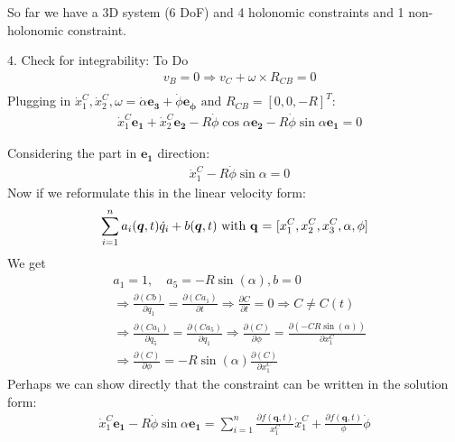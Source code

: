 \noindent So far we have a 3D system (6 DoF) and 4 holonomic constraints and 1 non-holonomic constraint.\vspace{1cm}

4. Check for integrability:
\Huge \color{red}To Do \color{black}\normalsize
\begin{equation}
    \begin{split}
        &v_B = 0 \Rightarrow v_C + \omega \times R_{CB} = 0\\
    \end{split}
\end{equation}
Plugging in $\dot{x}_1^C, \dot{x}_2^C, \omega = \dot{\alpha}\boldsymbol{e_3} + \dot\phi\boldsymbol{e_\phi} \text{ and } R_{CB} = [0,0,-R]^T$:
\begin{equation}
    \begin{split}
        &\dot x_1^C\boldsymbol{e_1} + \dot x_2^C\boldsymbol{e_2} -  R\dot\phi\cos\alpha\boldsymbol{e_2} - R\dot\phi\sin\alpha\boldsymbol{e_1} = 0
    \end{split}
\end{equation}

Considering the part in $\boldsymbol{e_1}$ direction:
\begin{equation}
    \begin{split}
        &\dot x_1^C - R\dot\phi\sin\alpha = 0 
    \end{split}
\end{equation}
Now if we reformulate this in the linear velocity form:
\begin{equation}
    \sum_{i=1}^n a_i(\boldsymbol{q},t)\dot q_i + b(\boldsymbol{q},t) \text{ with \textbf{q} = }[x_1^C,x_2^C, x_3^C,\alpha, \phi]
\end{equation}
We get
\begin{equation}
    \begin{split}
        &a_1 = 1, \quad a_5 = -R\sin(\alpha), b = 0\\
        &\Rightarrow \frac{\partial(Cb)}{\partial q_1} = \frac{\partial(Ca_1)}{\partial t} \Rightarrow \frac{\partial C}{\partial t} = 0 \Rightarrow C \neq C(t)\\
        &\Rightarrow \frac{\partial(Ca_1)}{\partial q_5} = \frac{\partial(Ca_5)}{\partial q_1} \Rightarrow \frac{\partial(C)}{\partial \phi} = \frac{\partial(-CR\sin(\alpha))}{\partial x_1^C}\\
        & \Rightarrow \frac{\partial(C)}{\partial \phi} = -R\sin(\alpha)\frac{\partial(C)}{\partial x_1^C}
    \end{split}
\end{equation}
Perhaps we can show directly that the constraint can be written in the solution form:
\begin{equation}
    \begin{split}
        \dot x_1^C\boldsymbol{e_1} - R\dot\phi\sin\alpha\boldsymbol{e_1} = \sum_{i=1}^n \frac{\partial f(\boldsymbol{q},t)}{x_1^C}\dot x_1^C + \frac{\partial f(\boldsymbol{q},t)}{\phi}\dot \phi
    \end{split}
\end{equation}
